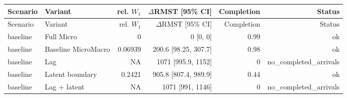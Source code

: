 \begin{longtable}{llrrrr}
\toprule
Scenario & Variant & rel. $W_1$ & $\Delta$RMST [95\% CI] & Completion & Status \\
\midrule
\endfirsthead
\toprule
Scenario & Variant & rel. $W_1$ & $\Delta$RMST [95\% CI] & Completion & Status \\
\midrule
\endhead
baseline & Full Micro & 0 & 0 [0, 0] & 0.99 & ok \\
baseline & Baseline MicroMacro & 0.06939 & 200.6 [98.25, 307.7] & 0.98 & ok \\
baseline & Lag & NA & 1071 [995.9, 1152] & 0 & no\_completed\_arrivals \\
baseline & Latent boundary & 0.2421 & 905.8 [807.4, 989.9] & 0.44 & ok \\
baseline & Lag + latent & NA & 1071 [991, 1146] & 0 & no\_completed\_arrivals \\
\bottomrule
\end{longtable}
